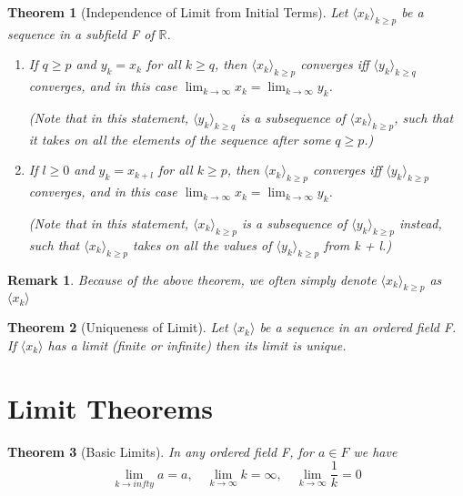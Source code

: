 \documentclass[11pt, oneside]{book}
\theoremstyle{break}
\newtheorem{thm}{Theorem}[section]
\newtheorem*{remark}{Remark}
\newcommand{\bb}[1]{\mathbb{#1}}			%
\begin{document}
\begin{thm}[Independence of Limit from Initial Terms]
	Let $\langle x_k \rangle_{k \geq p}$ be a sequence in a subfield F of $\bb{R}$.
	\begin{enumerate}
		\item If $q \geq p$ and $y_k = x_k$ for all $k \geq q$, then $\langle x_k \rangle_{k \geq p}$ converges iff $\langle y_k \rangle_{k \geq q}$ converges, and in this case $\lim_{k \to \infty} x_k = \lim_{k \to \infty} y_k$.

		(Note that in this statement, $\langle y_k \rangle_{k \geq q}$ is a subsequence of $\langle x_k \rangle_{k \geq p}$, such that it takes on all the elements of the sequence after some $q \geq p$.)
		\item If $l \geq 0$ and $y_k = x_{k + l}$ for all $k \geq p$, then $\langle x_k \rangle_{k \geq p}$ converges iff $\langle y_k \rangle_{k \geq p}$ converges, and in this case $\lim_{k \to \infty} x_k = \lim_{k \to \infty} y_k$.

		(Note that in this statement, $\langle x_k \rangle_{k \geq p}$ is a subsequence of $\langle y_k \rangle_{k \geq p}$ instead, such that $\langle x_k \rangle_{k \geq p}$ takes on all the values of $\langle y_k \rangle_{k \geq p}$ from k + l.)
	\end{enumerate}
\end{thm}

\begin{remark}
	Because of the above theorem, we often simply denote $\langle x_k \rangle_{k \geq p}$ as $\langle x_k \rangle$
\end{remark}

\begin{thm}[Uniqueness of Limit]
	Let $\langle x_k \rangle$ be a sequence in an ordered field F. If $\langle x_k \rangle$ has a limit (finite or infinite) then its limit is unique.
\end{thm}


\section{Limit Theorems}

\begin{thm}[Basic Limits]
	In any ordered field F, for $a \in F$ we have
	\[
		\lim_{k \to infty} a = a, \quad \lim_{k \to \infty} k = \infty, \quad \lim_{k \to \infty} \frac{1}{k} = 0
	\]
\end{thm}
\end{document}
